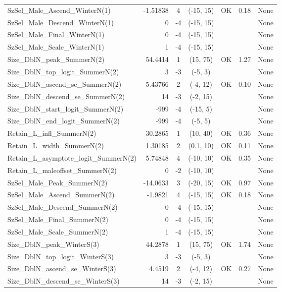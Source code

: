 \documentclass[12pt,]{article}
\begin{document}
\begin{landscape}
\begin{longtable}{lrcccll}
  SzSel\_Male\_Ascend\_WinterN(1) & -1.51838 & 4 & (-15, 15) & OK & 0.18 & None \\ 
  SzSel\_Male\_Descend\_WinterN(1) & 0 & -4 & (-15, 15) &  &  & None \\ 
  SzSel\_Male\_Final\_WinterN(1) & 0 & -4 & (-15, 15) &  &  & None \\ 
  SzSel\_Male\_Scale\_WinterN(1) & 1 & -4 & (-15, 15) &  &  & None \\ 
  Size\_DblN\_peak\_SummerN(2) & 54.4414 & 1 & (15, 75) & OK & 1.27 & None \\ 
  Size\_DblN\_top\_logit\_SummerN(2) & 3 & -3 & (-5, 3) &  &  & None \\ 
  Size\_DblN\_ascend\_se\_SummerN(2) & 5.43766 & 2 & (-4, 12) & OK & 0.10 & None \\ 
  Size\_DblN\_descend\_se\_SummerN(2) & 14 & -3 & (-2, 15) &  &  & None \\ 
  Size\_DblN\_start\_logit\_SummerN(2) & -999 & -4 & (-15, 5) &  &  & None \\ 
  Size\_DblN\_end\_logit\_SummerN(2) & -999 & -4 & (-5, 5) &  &  & None \\ 
  Retain\_L\_infl\_SummerN(2) & 30.2865 & 1 & (10, 40) & OK & 0.36 & None \\ 
  Retain\_L\_width\_SummerN(2) & 1.30185 & 2 & (0.1, 10) & OK & 0.11 & None \\ 
  Retain\_L\_asymptote\_logit\_SummerN(2) & 5.74848 & 4 & (-10, 10) & OK & 0.35 & None \\ 
  Retain\_L\_maleoffset\_SummerN(2) & 0 & -2 & (-10, 10) &  &  & None \\ 
  SzSel\_Male\_Peak\_SummerN(2) & -14.0633 & 3 & (-20, 15) & OK & 0.97 & None \\ 
  SzSel\_Male\_Ascend\_SummerN(2) & -1.9821 & 4 & (-15, 15) & OK & 0.18 & None \\ 
  SzSel\_Male\_Descend\_SummerN(2) & 0 & -4 & (-15, 15) &  &  & None \\ 
  SzSel\_Male\_Final\_SummerN(2) & 0 & -4 & (-15, 15) &  &  & None \\ 
  SzSel\_Male\_Scale\_SummerN(2) & 1 & -4 & (-15, 15) &  &  & None \\ 
  Size\_DblN\_peak\_WinterS(3) & 44.2878 & 1 & (15, 75) & OK & 1.74 & None \\ 
  Size\_DblN\_top\_logit\_WinterS(3) & 3 & -3 & (-5, 3) &  &  & None \\ 
  Size\_DblN\_ascend\_se\_WinterS(3) & 4.4519 & 2 & (-4, 12) & OK & 0.27 & None \\ 
  Size\_DblN\_descend\_se\_WinterS(3) & 14 & -3 & (-2, 15) &  &  & None \\ 

\end{longtable}
\end{landscape}
\end{document}
